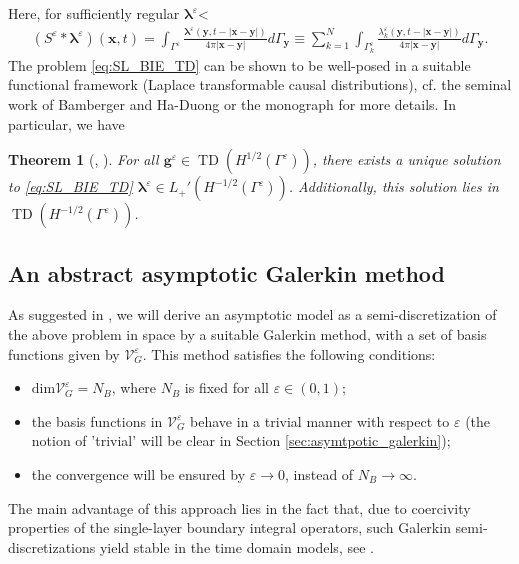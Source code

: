 \documentclass[]{article}
\newtheorem{theorem}{Theorem}
\numberwithin{equation}{section}
\numberwithin{theorem}{section}
\numberwithin{lemma}{section}
\numberwithin{corollary}{section}
\numberwithin{proposition}{section}
\numberwithin{definition}{section}
\newcommand{\blambda}{\boldsymbol{\lambda}}
\newcommand{\re}{\varepsilon}
\renewcommand{\vec}{\boldsymbol}
\begin{document}
	Here, for sufficiently regular $\blambda^{\re}$<
	\begin{align*}%
		(S^{\re} * \blambda^{\re}) (\boldsymbol{x},t) =\int_{\Gamma^{\re}} \frac{\blambda^{\re}(\boldsymbol{y}, t-|\boldsymbol{x}-\boldsymbol{y}|)}{4\pi |\boldsymbol{x}-\boldsymbol{y}|} d\Gamma_{\boldsymbol{y}}\equiv\sum\limits_{k=1}^N\int_{\Gamma_k^{\re}} \frac{\lambda_k^{\re}(\vec{y}, t-|\vec{x}-\vec{y}|)}{4\pi|\vec{x}-\vec{y}|}d\Gamma_{\vec{y}}.
	\end{align*}
	The problem \eqref{eq:SL_BIE_TD} can be shown to be  well-posed in a suitable functional framework (Laplace transformable causal distributions), cf. the seminal work of Bamberger and Ha-Duong  \cite{bamberger_ha_duong} or the monograph \cite{sayas} for more details.  In particular, we have
	\begin{theorem}[\cite{bamberger_ha_duong}, \cite{sayas}]
		For all $\vec{g}^{\re}\in \operatorname{TD}(H^{1/2}(\Gamma^{\re}))$, there exists a unique solution to \eqref{eq:SL_BIE_TD} $\vec{\lambda}^{\re}\in L_+'(H^{-1/2}(\Gamma^{\re}))$. Additionally, this solution lies in $\operatorname{TD}(H^{-1/2}(\Gamma^{\re}))$. 
	\end{theorem}
	\subsection{An abstract asymptotic Galerkin method}
	As suggested in \cite{MK}, we will derive an asymptotic model as a semi-discretization of the above problem in space by a suitable Galerkin method, with a set of basis functions given by $\mathcal{V}_G^{\re}$. This method satisfies the following conditions:
	\begin{itemize}[leftmargin=*]
		\item 
		$\text{dim}\mathcal{V}^{\re}_G= N_B$, where $N_B$ is fixed for all $\re \in (0,1)$; 
		\item the basis functions in $\mathcal{V}^{\re}_G$ behave in a trivial manner with respect to $\re$ (the notion of 'trivial' will be clear in Section \ref{sec:asymtpotic_galerkin});
		\item 
		the convergence will be ensured by $\re \to 0$, instead of $N_B \to \infty$.
	\end{itemize}
	The main advantage of this approach lies in the fact that, due to coercivity properties of the single-layer boundary integral operators, such Galerkin semi-discretizations yield stable in the time domain models, see \cite{banjai_sauter}.
	
\end{document}
